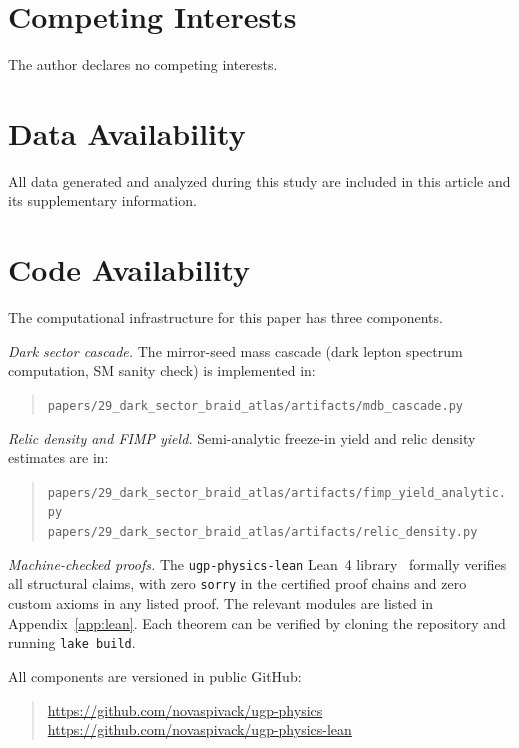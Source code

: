 \documentclass[11pt]{article}
\begin{document}
\section*{Competing Interests}
The author declares no competing interests.

\section*{Data Availability}
All data generated and analyzed during this study are included in this article and its supplementary information.

\section*{Code Availability}
The computational infrastructure for this paper has three components.

\emph{Dark sector cascade.}  The mirror-seed mass cascade (dark lepton spectrum computation, SM sanity check) is implemented in:
\begin{quote}
\small\raggedright\sloppy
\noindent\texttt{papers/29\_dark\_sector\_braid\_atlas/artifacts/mdb\_cascade.py}
\end{quote}

\emph{Relic density and FIMP yield.}  Semi-analytic freeze-in yield and relic density estimates are in:
\begin{quote}
\small\raggedright\sloppy
\noindent\texttt{papers/29\_dark\_sector\_braid\_atlas/artifacts/fimp\_yield\_analytic.py}\\
\noindent\texttt{papers/29\_dark\_sector\_braid\_atlas/artifacts/relic\_density.py}
\end{quote}

\emph{Machine-checked proofs.}  The \texttt{ugp-physics-lean} Lean~4 library~\cite{SpivackUGPPhysicsLean} formally verifies all structural claims, with zero \texttt{sorry} in the certified proof chains and zero custom axioms in any listed proof.  The relevant modules are listed in Appendix~\ref{app:lean}.  Each theorem can be verified by cloning the repository and running \texttt{lake build}.

\noindent
All components are versioned in public GitHub:
\begin{quote}
\small\raggedright\sloppy
\url{https://github.com/novaspivack/ugp-physics}\\
\url{https://github.com/novaspivack/ugp-physics-lean}
\end{quote}



\end{document}
